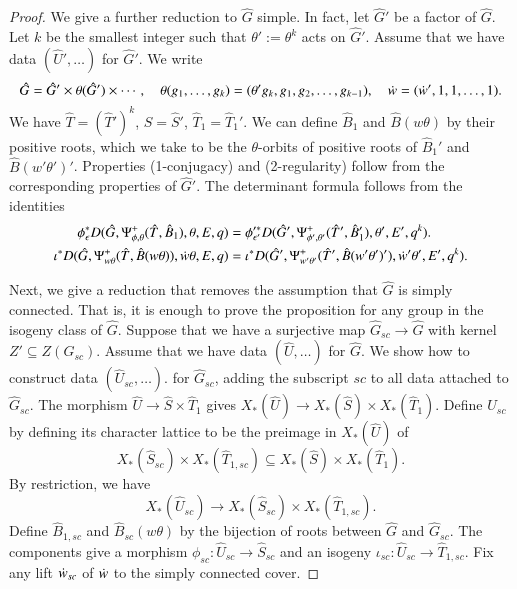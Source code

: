 \begin{proof}
  We give a further reduction to $\hat G$ simple.  In fact, let $\hat
  G'$ be a factor of $\hat G$.  Let $k$ be the smallest integer such
  that $\theta':=\theta^k$ acts on $\hat G'$.  Assume that we have data $(\hat
  U',\ldots)$ for $\hat G'$.  
  We write 
  \[
  \hat G = \hat G' \times \theta(\hat G') \times \cdots,
  \quad
  \theta(g_1,\ldots,g_k) = (\theta' g_k, g_1,g_2,\ldots,g_{k-1}),
  \quad
  \dot w = (\dot w',1,1,\ldots,1).
  \]
We have $\hat T = (\hat T')^k$, $\hat S
  = \hat S'$, $\hat T_1 = \hat T_1'$.  We can define $\hat B_1$ and
  $\hat B(w\theta)$ by their positive roots, which we take to be the
  $\theta$-orbits of positive roots of $\hat B_1'$ and $\hat
  B( w'\theta')'$.   Properties (1-conjugacy) and (2-regularity) follow from
  the corresponding properties of $\hat G'$.  The determinant formula follows from
  the identities
  \begin{align*}
    \phi^*_\epsilon D(\hat G,\Psi_{\phi,\theta}^+(\hat T,\hat B_1),\theta,E,q) &=
    \phi'^*_{\epsilon'} D(\hat G',\Psi_{\phi',\theta'}^+(\hat T',\hat B_1'),\theta',E',q^k).\\
    \iota^* D(\hat G,\Psi_{w\theta}^+(\hat T,\hat B(w\theta)),\dot w\theta,E,q) &=
    \iota^* D(\hat G',\Psi_{w'\theta'}^+(\hat T',\hat B(w'\theta')'),\dot w'\theta',E',q^k).
    \end{align*}

  Next, we give a reduction that removes the assumption that $\hat G$
  is simply connected.  That is, it is enough to prove the proposition for
  any group in the isogeny class of $\hat G$.
  Suppose that we have a surjective map $\hat
  G_{sc}\to \hat G$ with kernel $Z' \subseteq Z(G_{sc})$.  Assume that
  we have data $(\hat U,\ldots)$ for $\hat G$.  We show how to construct
  data $(\hat U_{sc},\ldots)$. for $\hat G_{sc}$, adding the subscript
  ${sc}$ to all data attached to $\hat G_{sc}$.  The morphism $\hat U
  \to \hat S\times \hat T_1$ gives $X_*(\hat U)\to X_*(\hat S)\times
  X_*(\hat T_1)$.  Define $\hat U_{sc}$ by defining its character
  lattice to be the preimage in $X_*(\hat U)$ of
\[
X_*(\hat S_{sc})\times X_*(\hat T_{1, sc}) 
\subseteq X_*(\hat S)\times X_*(\hat T_1).
\] 
By restriction, we have
\[
X_*(\hat U_{sc})\to X_*(\hat S_{sc}) \times X_*(\hat T_{1,sc}).  
\]
Define $\hat B_{1,sc}$ and $\hat B_{sc}(w\theta)$
by the bijection of roots between $\hat G$ and $\hat G_{sc}$.
The components give a morphism $\phi_{sc}:\hat U_{sc}\to\hat S_{sc}$
and an isogeny $\iota_{sc}:\hat U_{sc} \to \hat T_{1,sc}$.  Fix any
lift $\dot w_{sc}$ of $\dot w$ to the simply connected cover.


\end{proof}

